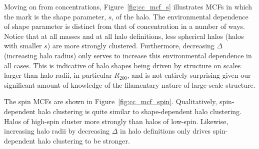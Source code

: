 \documentclass[usenatbib]{mnras}
\begin{document}
Moving on from concentrations, Figure~\ref{fig:cc_mcf_s} illustrates MCFs in which the mark is the shape
parameter, $s$, of the halo. The environmental dependence of shape parameter is distinct from that of
concentration in a number of ways. Notice that at all masses and at all halo definitions, less spherical halos
(halos with smaller $s$) are more strongly clustered. Furthermore, decreasing $\Delta$ (increasing halo radius)
only serves to increase this environmental dependence in all cases. This is indicative of halo shapes being
driven by structure on scales larger than halo radii, in particular $R_{200}$, and is not entirely surprising
given our significant amount of knowledge of the filamentary nature of large-scale structure. 


The spin MCFs are shown in Figure~\ref{fig:cc_mcf_spin}. Qualitatively, spin-dependent halo clustering is 
quite similar to shape-dependent halo clustering. Halos of high-spin cluster more strongly than halos of 
low-spin.  Likewise, increasing halo radii by decreasing $\Delta$
in halo definitions only drives spin-dependent halo clustering to be stronger.
\end{document}
